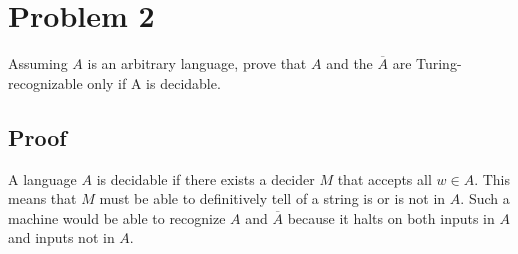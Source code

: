 \documentclass[11pt letter]{article}
\begin{document}
\newpage

\section{Problem 2}
Assuming $A$ is an arbitrary language, prove that $A$ and the $\overline{A}$ are Turing-recognizable only if A is decidable.

\subsection{Proof}
A language $A$ is decidable if there exists a decider $M$ that accepts all $w \in A$. This means that $M$ must be able to definitively tell of a string is or is not in $A$. Such a machine would be able to recognize $A$ and $\overline{A}$ because it halts on both inputs in $A$ and inputs not in $A$.
\end{document}
